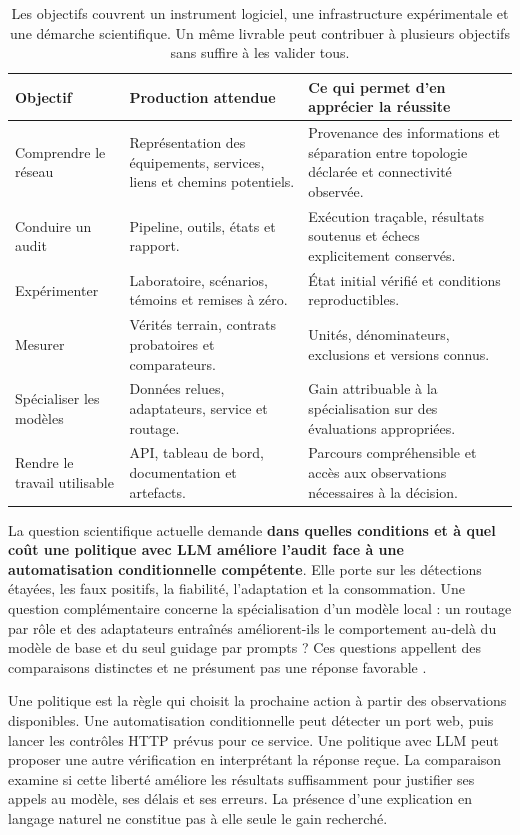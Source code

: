 \documentclass[11pt,a4paper]{article}
\begin{document}
\begin{table}[htbp]
\centering\small
\begin{tabularx}{\linewidth}{@{}>{\raggedright\arraybackslash}p{28mm}YY@{}}
\toprule
Objectif & Production attendue & Ce qui permet d'en apprécier la réussite\\
\midrule
Comprendre le réseau & Représentation des équipements, services, liens et chemins potentiels. & Provenance des informations et séparation entre topologie déclarée et connectivité observée.\\
Conduire un audit & Pipeline, outils, états et rapport. & Exécution traçable, résultats soutenus et échecs explicitement conservés.\\
Expérimenter & Laboratoire, scénarios, témoins et remises à zéro. & État initial vérifié et conditions reproductibles.\\
Mesurer & Vérités terrain, contrats probatoires et comparateurs. & Unités, dénominateurs, exclusions et versions connus.\\
Spécialiser les modèles & Données relues, adaptateurs, service et routage. & Gain attribuable à la spécialisation sur des évaluations appropriées.\\
Rendre le travail utilisable & API, tableau de bord, documentation et artefacts. & Parcours compréhensible et accès aux observations nécessaires à la décision.\\
\bottomrule
\end{tabularx}
\caption{Les objectifs couvrent un instrument logiciel, une infrastructure
expérimentale et une démarche scientifique. Un même livrable peut contribuer à
plusieurs objectifs sans suffire à les valider tous.}
\label{tab:intro-objectifs}
\end{table}

La question scientifique actuelle demande \textbf{dans quelles conditions et à
quel coût une politique avec LLM améliore l'audit face à une automatisation
conditionnelle compétente}. Elle porte sur les détections étayées, les faux
positifs, la fiabilité, l'adaptation et la consommation. Une question
complémentaire concerne la spécialisation d'un modèle local : un routage par
rôle et des adaptateurs entraînés améliorent-ils le comportement au-delà du
modèle de base et du seul guidage par prompts ? Ces questions appellent des
comparaisons distinctes et ne présument pas une réponse favorable
\cite{intro-protocol,intro-mission}.

Une politique est la règle qui choisit la prochaine action à partir des
observations disponibles. Une automatisation conditionnelle peut détecter un
port web, puis lancer les contrôles HTTP prévus pour ce service. Une politique
avec LLM peut proposer une autre vérification en interprétant la réponse reçue.
La comparaison examine si cette liberté améliore les résultats suffisamment
pour justifier ses appels au modèle, ses délais et ses erreurs. La présence
d'une explication en langage naturel ne constitue pas à elle seule le gain
recherché.
\end{document}
